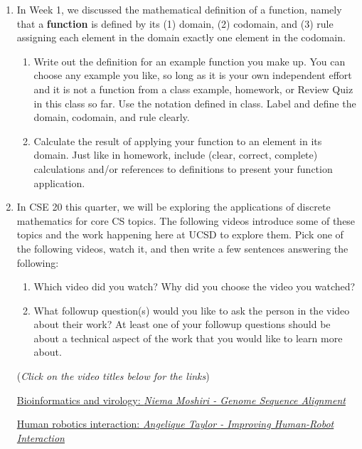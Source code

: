 \documentclass[12pt, oneside]{article}
\begin{document}
\begin{enumerate}
\item 

In Week 1, we discussed the mathematical definition of a function, namely
that a {\bf function} is defined by its (1) domain, (2) codomain, and (3) rule assigning each 
element in the domain exactly one element in the codomain.

\begin{enumerate}
    \item Write out the definition for an example function you make up.
    You can choose any example you like, so long as it is your own independent 
    effort and it is not a function from a class example, homework, or Review Quiz in this class so far.
    Use the notation defined in class. Label and define the domain, codomain, and rule clearly.
    \item Calculate the result of applying your function to an element in its domain.
    Just like in homework, include (clear, correct, complete) calculations and/or references to definitions
    to present your function application.
\end{enumerate}

\item In CSE 20 this quarter, we will be exploring the applications of discrete mathematics for core CS topics. 
The following videos introduce some of these topics and the 
work happening here at UCSD to explore them. Pick one of the following videos, watch it, and 
then write a few sentences answering the following:
\begin{enumerate}
\item Which video did you watch? Why did you choose the video you watched?
\item What followup question(s) would you like to ask the person in the video about their work?
At least one of your followup questions should be about a technical aspect of the work that you
would like to learn more about.
\end{enumerate}

({\it Click on the video titles below for the links})

\href{https://www.youtube.com/watch?v=PrAoks7OhE8}{Bioinformatics and virology: 
{\it Niema Moshiri - Genome Sequence Alignment}}

\href{https://www.uctv.tv/computer-science/search-details.aspx?showID=33425}{Human robotics interaction: 
{\it Angelique Taylor - Improving Human-Robot Interaction}}


\end{enumerate}
\end{document}
